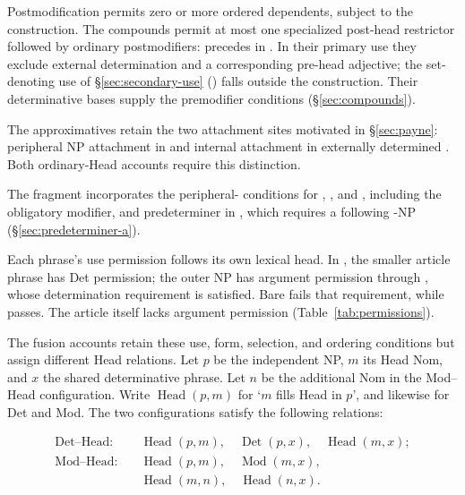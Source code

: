 \documentclass[12pt]{article}
\begin{document}
Postmodification permits zero or more ordered dependents, subject to the construction. The compounds permit at most one specialized post-head restrictor followed by ordinary postmodifiers:  precedes  in . In their primary use they exclude external determination and a corresponding pre-head adjective; the set-denoting use of §\ref{sec:secondary-use} () falls outside the construction. Their determinative bases supply the premodifier conditions (§\ref{sec:compounds}).

The approximatives retain the two attachment sites motivated in §\ref{sec:payne}: peripheral NP attachment in  and internal attachment in externally determined . Both ordinary-Head accounts require this distinction.

The fragment incorporates the peripheral- conditions for , , and , including the obligatory modifier, and predeterminer  in , which requires a following -NP (§\ref{sec:predeterminer-a}).

Each phrase's use permission follows its own lexical head. In , the smaller article phrase has Det permission; the outer NP has argument permission through , whose determination requirement is satisfied. Bare  fails that requirement, while  passes. The article itself lacks argument permission (Table~\ref{tab:permissions}).

The fusion accounts retain these use, form, selection, and ordering conditions but assign different Head relations. Let $p$ be the independent NP, $m$ its Head Nom, and $x$ the shared determinative phrase. Let $n$ be the additional Nom in the Mod--Head configuration. Write $\operatorname{Head}(p,m)$ for \enquote*{$m$ fills Head in $p$}, and likewise for Det and Mod. The two configurations satisfy the following relations:

\[
\begin{aligned}
\text{Det--Head:}\quad
 &\operatorname{Head}(p,m),\quad \operatorname{Det}(p,x),\quad \operatorname{Head}(m,x); \\
\text{Mod--Head:}\quad
 &\operatorname{Head}(p,m),\quad \operatorname{Mod}(m,x),\\
 &\operatorname{Head}(m,n),\quad \operatorname{Head}(n,x).
\end{aligned}
\]
\end{document}
